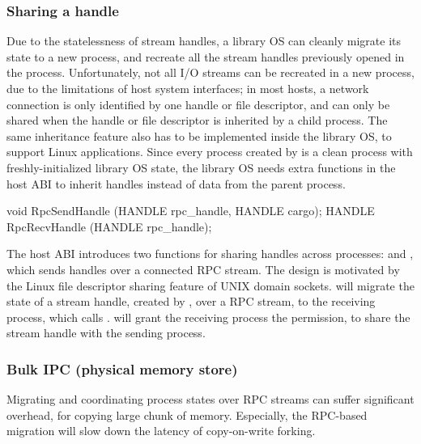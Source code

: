 \subsubsection*{Sharing a handle}




Due to the statelessness of stream handles,
a library OS can cleanly migrate its state to a new process, and recreate all the stream handles previously opened in the process.
Unfortunately, not all I/O streams can be recreated
in a new process, due to the limitations of host system interfaces;
in most hosts, a network connection is only identified by one handle or file descriptor,
and can only be shared when the handle or file descriptor
is inherited by a child process.
The same inheritance feature also has to be implemented
inside the library OS, to support Linux applications.
Since every process created by  is a clean \graphene{} process with freshly-initialized library OS state,
the library OS needs extra functions in the host ABI
to inherit handles instead of data from the parent process.


\begin{paldef}
void   RpcSendHandle (HANDLE rpc_handle, HANDLE cargo);
HANDLE RpcRecvHandle (HANDLE rpc_handle);
\end{paldef}



The host ABI introduces two functions for sharing handles across processes:  and , which sends handles over a connected RPC stream.
The design is motivated by the Linux file descriptor sharing feature of UNIX domain sockets.
 will migrate the state of a stream handle, created by ,
over a RPC stream, to the receiving process, which calls .
 will grant the receiving process the permission, to share the stream handle with the sending process.


\subsubsection*{Bulk IPC (physical memory store)}


Migrating and coordinating process states over RPC streams
can suffer significant overhead, for copying large chunk of memory.
Especially, the RPC-based migration will slow down the latency of copy-on-write forking.

